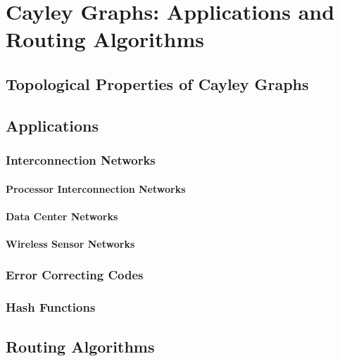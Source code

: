 
\chapter{Cayley Graphs: Applications and Routing Algorithms} %
\label{ch:cg_app_routing}

\ifpdf
    \graphicspath{{3_cg_app_routing/figures/PNG/}{3_cg_app_routing/figures/PDF/}{3_cg_app_routing/figures/}}
\else
    \graphicspath{{3_cg_app_routing/figures/EPS/}{3_cg_app_routing/figures/}}
\fi


\section{Topological Properties of Cayley Graphs}
\section{Applications}
\subsection{Interconnection Networks}
\subsubsection{Processor Interconnection Networks}
\subsubsection{Data Center Networks}
\subsubsection{Wireless Sensor Networks}
\subsection{Error Correcting Codes}
\subsection{Hash Functions}
\section{Routing Algorithms}
